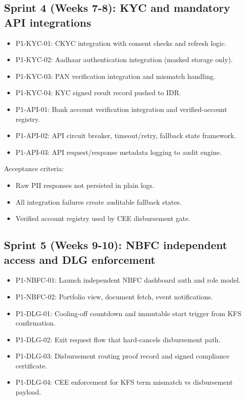 ﻿\documentclass[12pt]{article}
\begin{document}
\subsection{Sprint 4 (Weeks 7-8): KYC and mandatory API integrations}


\begin{itemize}
\item P1-KYC-01: CKYC integration with consent checks and refresh logic.
\item P1-KYC-02: Aadhaar authentication integration (masked storage only).
\item P1-KYC-03: PAN verification integration and mismatch handling.
\item P1-KYC-04: KYC signed result record pushed to IDR.
\item P1-API-01: Bank account verification integration and verified-account registry.
\item P1-API-02: API circuit breaker, timeout/retry, fallback state framework.
\item P1-API-03: API request/response metadata logging to audit engine.
\end{itemize}

Acceptance criteria:

\begin{itemize}
\item Raw PII responses not persisted in plain logs.
\item All integration failures create auditable fallback states.
\item Verified account registry used by CEE disbursement gate.
\end{itemize}

\subsection{Sprint 5 (Weeks 9-10): NBFC independent access and DLG enforcement}


\begin{itemize}
\item P1-NBFC-01: Launch independent NBFC dashboard auth and role model.
\item P1-NBFC-02: Portfolio view, document fetch, event notifications.
\item P1-DLG-01: Cooling-off countdown and immutable start trigger from KFS confirmation.
\item P1-DLG-02: Exit request flow that hard-cancels disbursement path.
\item P1-DLG-03: Disbursement routing proof record and signed compliance certificate.
\item P1-DLG-04: CEE enforcement for KFS term mismatch vs disbursement payload.
\end{itemize}
\end{document}
